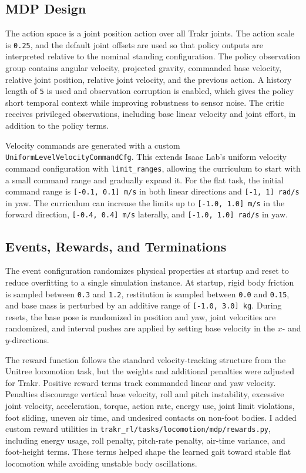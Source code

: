\subsection{MDP Design}

The action space is a joint position action over all Trakr joints. The action scale is \texttt{0.25}, and
the default joint offsets are used so that policy outputs are interpreted relative to the nominal standing
configuration. The policy observation group contains angular velocity, projected gravity, commanded base
velocity, relative joint position, relative joint velocity, and the previous action. A history length of
\texttt{5} is used and observation corruption is enabled, which gives the policy short temporal context
while improving robustness to sensor noise. The critic receives privileged observations, including base
linear velocity and joint effort, in addition to the policy terms.

Velocity commands are generated with a custom \texttt{UniformLevelVelocityCommandCfg}. This extends Isaac
Lab's uniform velocity command configuration with \texttt{limit\_ranges}, allowing the curriculum to start
with a small command range and gradually expand it. For the flat task, the initial command range is
\texttt{[-0.1, 0.1] m/s} in both linear directions and \texttt{[-1, 1] rad/s} in yaw. The curriculum can
increase the limits up to \texttt{[-1.0, 1.0] m/s} in the forward direction,
\texttt{[-0.4, 0.4] m/s} laterally, and \texttt{[-1.0, 1.0] rad/s} in yaw.

\subsection{Events, Rewards, and Terminations}

The event configuration randomizes physical properties at startup and reset to reduce overfitting to a
single simulation instance. At startup, rigid body friction is sampled between \texttt{0.3} and
\texttt{1.2}, restitution is sampled between \texttt{0.0} and \texttt{0.15}, and base mass is perturbed by
an additive range of \texttt{[-1.0, 3.0] kg}. During resets, the base pose is randomized in position and
yaw, joint velocities are randomized, and interval pushes are applied by setting base velocity in the
\(x\)- and \(y\)-directions.

The reward function follows the standard velocity-tracking structure from the Unitree locomotion task, but
the weights and additional penalties were adjusted for Trakr. Positive reward terms track commanded
linear and yaw velocity. Penalties discourage vertical base velocity, roll and pitch instability, excessive
joint velocity, acceleration, torque, action rate, energy use, joint limit violations, foot sliding,
uneven air time, and undesired contacts on non-foot bodies. I added custom reward utilities in
\texttt{trakr\_rl/tasks/locomotion/mdp/rewards.py}, including energy usage, roll penalty, pitch-rate
penalty, air-time variance, and foot-height terms. These terms helped shape the learned gait toward stable
flat locomotion while avoiding unstable body oscillations.


